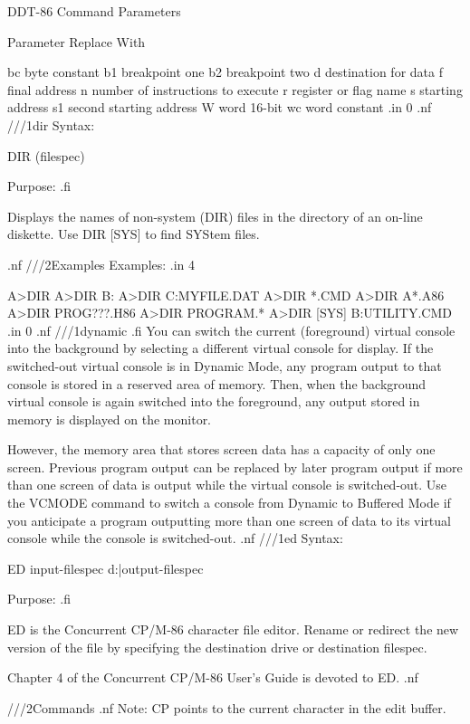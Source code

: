 DDT-86 Command Parameters

Parameter   Replace With

   bc       byte constant
   b1       breakpoint one
   b2       breakpoint two
   d        destination for data
   f        final address
   n        number of instructions
            to execute
   r        register or flag name
   s        starting address
   s1       second starting address
   W        word 16-bit
   wc       word constant
.in 0
.nf
///1dir
Syntax: 

DIR (filespec)

Purpose:
.fi

Displays the names of non-system (DIR) files in the directory
of an on-line diskette.  Use DIR [SYS] to find SYStem files.

.nf
///2Examples
Examples:
.in 4

A>DIR
A>DIR B:
A>DIR C:MYFILE.DAT
A>DIR *.CMD
A>DIR A*.A86
A>DIR PROG???.H86
A>DIR PROGRAM.*
A>DIR [SYS] B:UTILITY.CMD
.in 0
.nf
///1dynamic 
.fi
You can switch the current (foreground) virtual console into 
the background by selecting a different virtual console for display. 
If the switched-out virtual console is in Dynamic Mode, any program 
output to that console is stored in a reserved area of memory. 
Then, when the 
background virtual console is again switched into the foreground, 
any output stored in memory is displayed on the monitor.

However, the memory area that stores screen data has a capacity of 
only one screen. Previous program output can be replaced by later program
output if more than one screen 
of data is output while the virtual console is switched-out. 
Use the VCMODE command to switch a console from Dynamic to Buffered 
Mode if you anticipate a program outputting more than one screen of 
data to its virtual console while the console is switched-out.
.nf
///1ed
Syntax:

ED input-filespec {d:|output-filespec}

Purpose:
.fi

ED is the Concurrent CP/M-86 character file editor. Rename or
redirect the new version of the file by specifying the
destination drive or destination filespec. 

Chapter 4 of the Concurrent CP/M-86 User's Guide is devoted to
ED. 
.nf

///2Commands
.nf
Note:   CP points to the current character in the edit buffer.     

